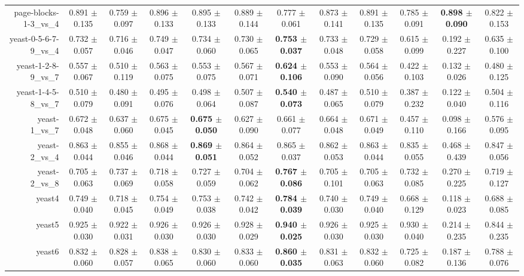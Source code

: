 \begin{table}[!ht]
{\begin{tabular}{r c c c c c c c c c c c}
page-blocks-1-3\_vs\_4 & 0.891 $\pm$ 0.135 & 0.759 $\pm$ 0.097 & 0.896 $\pm$ 0.133 & 0.895 $\pm$ 0.133 & 0.889 $\pm$ 0.144 & 0.777 $\pm$ 0.061 & 0.873 $\pm$ 0.141 & 0.891 $\pm$ 0.135 & 0.785 $\pm$ 0.091 & \textbf{0.898 $\pm$ 0.090} & 0.822 $\pm$ 0.153 \\
yeast-0-5-6-7-9\_vs\_4 & 0.732 $\pm$ 0.057 & 0.716 $\pm$ 0.046 & 0.749 $\pm$ 0.047 & 0.734 $\pm$ 0.060 & 0.730 $\pm$ 0.065 & \textbf{0.753 $\pm$ 0.037} & 0.733 $\pm$ 0.048 & 0.729 $\pm$ 0.058 & 0.615 $\pm$ 0.099 & 0.192 $\pm$ 0.227 & 0.635 $\pm$ 0.100 \\
yeast-1-2-8-9\_vs\_7 & 0.557 $\pm$ 0.067 & 0.510 $\pm$ 0.119 & 0.563 $\pm$ 0.075 & 0.553 $\pm$ 0.075 & 0.567 $\pm$ 0.071 & \textbf{0.624 $\pm$ 0.106} & 0.553 $\pm$ 0.090 & 0.564 $\pm$ 0.056 & 0.422 $\pm$ 0.103 & 0.132 $\pm$ 0.026 & 0.480 $\pm$ 0.125 \\
yeast-1-4-5-8\_vs\_7 & 0.510 $\pm$ 0.079 & 0.480 $\pm$ 0.091 & 0.495 $\pm$ 0.076 & 0.498 $\pm$ 0.064 & 0.507 $\pm$ 0.087 & \textbf{0.540 $\pm$ 0.073} & 0.487 $\pm$ 0.065 & 0.510 $\pm$ 0.079 & 0.387 $\pm$ 0.232 & 0.122 $\pm$ 0.040 & 0.504 $\pm$ 0.116 \\
yeast-1\_vs\_7 & 0.672 $\pm$ 0.048 & 0.637 $\pm$ 0.060 & 0.675 $\pm$ 0.045 & \textbf{0.675 $\pm$ 0.050} & 0.627 $\pm$ 0.090 & 0.661 $\pm$ 0.077 & 0.664 $\pm$ 0.048 & 0.671 $\pm$ 0.049 & 0.457 $\pm$ 0.110 & 0.098 $\pm$ 0.166 & 0.576 $\pm$ 0.095 \\
yeast-2\_vs\_4 & 0.863 $\pm$ 0.044 & 0.855 $\pm$ 0.046 & 0.868 $\pm$ 0.044 & \textbf{0.869 $\pm$ 0.051} & 0.864 $\pm$ 0.052 & 0.865 $\pm$ 0.037 & 0.862 $\pm$ 0.053 & 0.863 $\pm$ 0.044 & 0.835 $\pm$ 0.055 & 0.468 $\pm$ 0.439 & 0.847 $\pm$ 0.056 \\
yeast-2\_vs\_8 & 0.705 $\pm$ 0.063 & 0.737 $\pm$ 0.069 & 0.718 $\pm$ 0.058 & 0.727 $\pm$ 0.059 & 0.704 $\pm$ 0.062 & \textbf{0.767 $\pm$ 0.086} & 0.705 $\pm$ 0.101 & 0.705 $\pm$ 0.063 & 0.732 $\pm$ 0.085 & 0.270 $\pm$ 0.225 & 0.719 $\pm$ 0.127 \\
yeast4 & 0.749 $\pm$ 0.040 & 0.718 $\pm$ 0.045 & 0.754 $\pm$ 0.049 & 0.753 $\pm$ 0.038 & 0.742 $\pm$ 0.042 & \textbf{0.784 $\pm$ 0.039} & 0.740 $\pm$ 0.030 & 0.749 $\pm$ 0.040 & 0.668 $\pm$ 0.129 & 0.118 $\pm$ 0.023 & 0.688 $\pm$ 0.085 \\
yeast5 & 0.925 $\pm$ 0.030 & 0.922 $\pm$ 0.031 & 0.926 $\pm$ 0.030 & 0.926 $\pm$ 0.030 & 0.928 $\pm$ 0.029 & \textbf{0.940 $\pm$ 0.025} & 0.926 $\pm$ 0.030 & 0.925 $\pm$ 0.030 & 0.930 $\pm$ 0.040 & 0.214 $\pm$ 0.235 & 0.844 $\pm$ 0.235 \\
yeast6 & 0.832 $\pm$ 0.060 & 0.828 $\pm$ 0.057 & 0.838 $\pm$ 0.065 & 0.830 $\pm$ 0.060 & 0.833 $\pm$ 0.060 & \textbf{0.860 $\pm$ 0.035} & 0.831 $\pm$ 0.063 & 0.832 $\pm$ 0.060 & 0.725 $\pm$ 0.082 & 0.187 $\pm$ 0.136 & 0.788 $\pm$ 0.076 \\

\end{tabular}}
\end{table}
